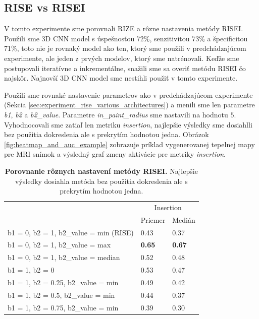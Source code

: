 \subsection{RISE vs RISEI}

V tomto experimente sme porovnali RIZE a rôzne nastavenia metódy RISEI. Použili sme 3D CNN model s úspešnosťou 72\%, senzitivitou 73\% a špecificitou 71\%, toto nie je rovnaký model ako ten, ktorý sme použili v predchádzajúcom experimente, ale jeden z prvých modelov, ktorý sme natrénovali. Keďže sme postupovali iteratívne a inkrementálne, snažili sme sa overiť metódu RISEI čo najskôr. Najnovší 3D CNN model sme nestihli použiť v tomto experimente. 

Použili sme rovnaké nastavenie parametrov ako v predchádzajúcom experimente (Sekcia \ref{sec:experiment_rise_various_architectures}) a menili sme len parametre \textit{b1}, \textit{b2} a \textit{b2\_value}. Parametre \textit{in\_paint\_radius} sme nastavili na hodnotu $5$. Vyhodnocovali sme zatiaľ len metriku \textit{insertion}, najlepšie výsledky sme dosiahlli bez použitia dokreslenia ale s prekrytím hodnotou jedna. Obrázok \ref{fig:heatmap_and_auc_example} zobrazuje príklad vygenerovanej tepelnej mapy pre MRI snímok a výsledný graf zmeny aktivácie pre metriky \textit{insertion}.

\begin{table}[]
    \centering
    \begin{tabular}{l|l|l|}
        \cline{2-3}
                                                                    & \multicolumn{2}{c|}{Insertion} \\ \cline{2-3} 
                                                                    & Priemer        & Medián        \\ \hline
        \multicolumn{1}{|l|}{b1 =  0, b2 = 1, b2\_value = min (RISE)} & 0.43           & 0.37          \\ \hline
        \multicolumn{1}{|l|}{b1 =  0, b2 = 1, b2\_value = max}        & \textbf{0.65}  & \textbf{0.67} \\ \hline
        \multicolumn{1}{|l|}{b1 =  0, b2 = 1, b2\_value = median}     & 0.52           & 0.48          \\ \hline
        \multicolumn{1}{|l|}{b1 =  1, b2 = 0}                        & 0.53           & 0.47          \\ \hline
        \multicolumn{1}{|l|}{b1 =  1, b2 = 0.25, b2\_value = min}     & 0.49           & 0.42          \\ \hline
        \multicolumn{1}{|l|}{b1 =  1, b2 = 0.5, b2\_value = min}      & 0.44           & 0.37          \\ \hline
        \multicolumn{1}{|l|}{b1 =  1, b2 = 0.75, b2\_value = min}     & 0.39           & 0.30          \\ \hline
    \end{tabular}
    \caption{\textbf{Porovnanie rôznych nastavení metódy RISEI.} Najlepšie výsledky dosiahla metóda bez použitia dokreslenia ale s prekrytím hodnotou jedna.}
    \label{tab:experiment_risei_various_configuration}
\end{table}

